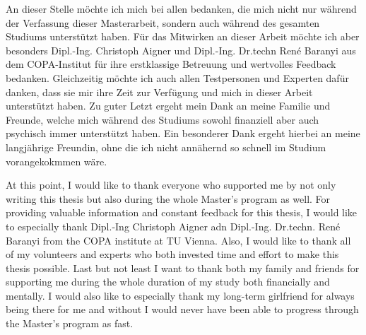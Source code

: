 \documentclass[draft,final]{vutinfth} %
\begin{document}
\frontmatter %

\addstatementpage

\begin{danksagung*}
An dieser Stelle möchte ich mich bei allen bedanken, die mich nicht nur während der Verfassung dieser Masterarbeit, sondern auch während des gesamten Studiums unterstützt haben. Für das Mitwirken an dieser Arbeit möchte ich aber besonders Dipl.-Ing. Christoph Aigner und Dipl.-Ing. Dr.techn René Baranyi aus dem COPA-Institut für ihre erstklassige Betreuung und wertvolles Feedback bedanken. Gleichzeitig möchte ich auch allen Testpersonen und Experten dafür danken, dass sie mir ihre Zeit zur Verfügung und mich in dieser Arbeit unterstützt haben. Zu guter Letzt ergeht mein Dank an meine Familie und Freunde, welche mich während des Studiums sowohl finanziell aber auch psychisch immer unterstützt haben. Ein besonderer Dank ergeht hierbei an meine langjährige Freundin, ohne die ich nicht annähernd so schnell im Studium vorangekokmmen wäre. \end{danksagung*}

\begin{acknowledgements*}
At this point, I would like to thank everyone who supported me by not only writing this thesis but also during the whole Master's program as well. For providing valuable information and constant feedback for this thesis, I would like to especially thank Dipl.-Ing Christoph Aigner adn Dipl.-Ing. Dr.techn. René Baranyi from the COPA institute at TU Vienna. Also, I would like to thank all of my volunteers and experts who both invested time and effort to make this thesis possible. Last but not least I want to thank both my family and friends for supporting me during the whole duration of my study both financially and mentally. I would also like to especially thank my long-term girlfriend for always being there for me and without I would never have been able to progress through the Master's program as fast.
\end{acknowledgements*}
\end{document}
